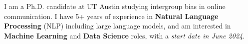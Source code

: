 I am a Ph.D. candidate at UT Austin studying intergroup bias in online communication. I have 5+ years of experience in \textbf{Natural Language Processing} (NLP) including large language models, and am interested in  \textbf{Machine Learning} and \textbf{Data Science} roles, with a \emph{start date in June 2024}.

